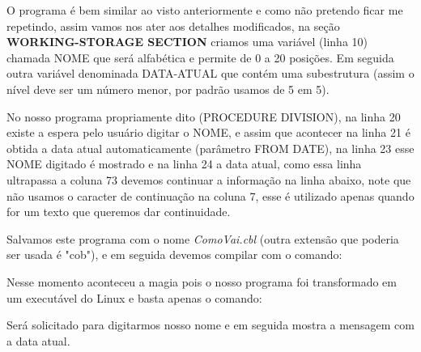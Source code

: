 O programa é bem similar ao visto anteriormente e como  não pretendo ficar me repetindo, assim vamos nos ater aos detalhes modificados, na seção \textbf{WORKING-STORAGE SECTION} criamos uma variável (linha 10) chamada NOME que será alfabética e permite de 0 a 20 posições. Em seguida outra variável denominada DATA-ATUAL que contém uma subestrutura (assim o nível deve ser um número menor, por padrão usamos de 5 em 5).

No nosso programa propriamente dito (PROCEDURE DIVISION), na linha 20 existe a espera pelo usuário digitar o NOME, e assim que acontecer na linha 21 é obtida a data atual automaticamente (parâmetro FROM DATE), na linha 23 esse NOME digitado é mostrado e na linha 24 a data atual, como essa linha ultrapassa a coluna 73 devemos continuar a informação na linha abaixo, note que não usamos o caracter de continuação na coluna 7, esse é utilizado apenas quando for um texto que queremos dar continuidade.

Salvamos este programa com o nome \textit{ComoVai.cbl} (outra extensão que poderia ser usada é "cob"), e em seguida devemos compilar com o comando: \\

Nesse momento aconteceu a magia pois o nosso programa foi transformado em um executável do Linux e basta apenas o comando: \\

Será solicitado para digitarmos nosso nome e em seguida mostra a mensagem com a data atual.
\clearpage